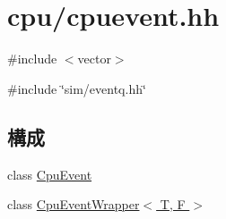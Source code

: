 \hypertarget{cpuevent_8hh}{
\section{cpu/cpuevent.hh}
\label{cpuevent_8hh}
}
{\ttfamily \#include $<$vector$>$}\par
{\ttfamily \#include \char`\"{}sim/eventq.hh\char`\"{}}\par
\subsection*{構成}
\begin{DoxyCompactItemize}
\item 
class \hyperlink{classCpuEvent}{CpuEvent}
\item 
class \hyperlink{classCpuEventWrapper}{CpuEventWrapper$<$ T, F $>$}
\end{DoxyCompactItemize}
